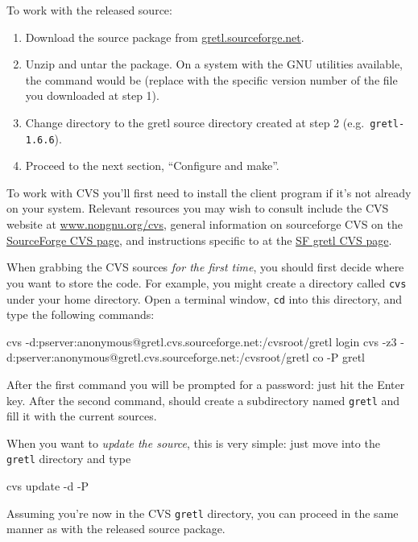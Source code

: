To work with the released source:
\begin{enumerate}
\item Download the  source package from
  \href{http://gretl.sourceforge.net/}{gretl.sourceforge.net}.
\item Unzip and untar the package.  On a system with the GNU utilities
  available, the command would be 
  (replace  with the specific version number of the file you
  downloaded at step 1).
\item Change directory to the gretl source directory created at step 2
  (e.g.\ \verb+gretl-1.6.6+).
\item Proceed to the next section, ``Configure and make''.
\end{enumerate}

To work with CVS you'll first need to install the  client
program if it's not already on your system.  Relevant resources
you may wish to consult include the CVS website at
\href{http://www.nongnu.org/cvs/}{www.nongnu.org/cvs},
general information on sourceforge CVS on the 
  \href{http://sourceforge.net/docman/display_doc.php?docid=14035&group_id=1}{SourceForge
    CVS page}, and instructions specific to  at the
\href{http://sourceforge.net/cvs/?group_id=36234}{SF gretl CVS page}.

When grabbing the CVS sources \textit{for the first time}, you should
first decide where you want to store the code.  For example, you might
create a directory called \texttt{cvs} under your home directory.
Open a terminal window, \texttt{cd} into this directory, and type
the following commands:
%
\begin{code}
cvs -d:pserver:anonymous@gretl.cvs.sourceforge.net:/cvsroot/gretl login
cvs -z3 -d:pserver:anonymous@gretl.cvs.sourceforge.net:/cvsroot/gretl co -P gretl
\end{code}
%
After the first command you will be prompted for a password: just hit
the Enter key.  After the second command,  should create a
subdirectory named \texttt{gretl} and fill it with the current
sources.

When you want to \textit{update the source}, this is very simple: just move into
the \texttt{gretl} directory and type
\begin{code}
cvs update -d -P
\end{code}

Assuming you're now in the CVS \texttt{gretl} directory, you can
proceed in the same manner as with the released source package.


